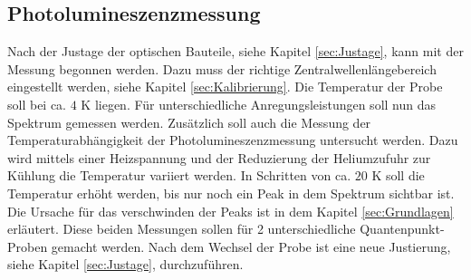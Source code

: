 \subsection{Photolumineszenzmessung}
Nach der Justage der optischen Bauteile, siehe Kapitel \ref{sec:Justage}, kann mit der Messung begonnen werden.
Dazu muss der richtige Zentralwellenlängebereich eingestellt werden, siehe Kapitel \ref{sec:Kalibrierung}. 
Die Temperatur der Probe soll bei ca. $4$ K liegen. Für unterschiedliche Anregungsleistungen soll nun das Spektrum gemessen werden.  
Zusätzlich soll auch die Messung der Temperaturabhängigkeit der Photolumineszenzmessung untersucht werden. 
Dazu wird mittels einer Heizspannung und der Reduzierung der Heliumzufuhr zur Kühlung die Temperatur variiert werden.
In Schritten von ca. $20$ K soll die Temperatur erhöht werden, bis nur noch ein Peak in dem Spektrum sichtbar ist. Die Ursache für das verschwinden der Peaks ist in dem Kapitel \ref{sec:Grundlagen} erläutert. 
Diese beiden Messungen sollen für 2 unterschiedliche Quantenpunkt-Proben gemacht werden. 
Nach dem Wechsel der Probe ist eine neue Justierung, siehe Kapitel \ref{sec:Justage}, durchzuführen.  



